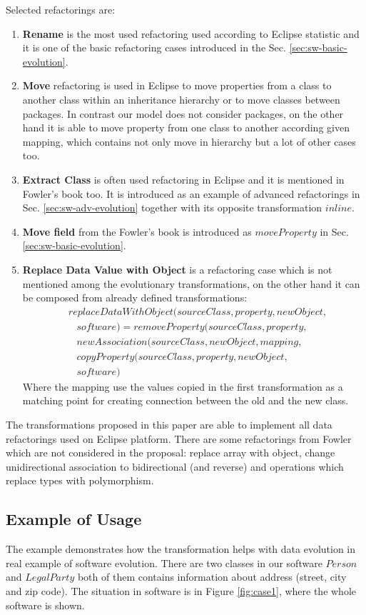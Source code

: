 \documentclass[11pt]{article}
\begin{document}
Selected refactorings are:
\begin{enumerate}
	\item \textbf{Rename} is the most used refactoring used according to Eclipse statistic and it is one of the basic refactoring cases introduced in the Sec. \ref{sec:sw-basic-evolution}.
	\item  \textbf{Move} refactoring is used in Eclipse to move properties from a class to another class within an inheritance hierarchy or to move classes between packages. In contrast our model does not consider packages, on the other hand it is able to move property from one class to another according given mapping, which contains not only move in hierarchy but a lot of other cases too.
	\item \textbf{Extract Class} is often used refactoring in Eclipse and it is mentioned in Fowler's book too. It is introduced as an example of advanced refactorings in Sec. \ref{sec:sw-adv-evolution} together with its opposite transformation $inline$.
	\item \textbf{Move field} from the Fowler's book is introduced as $moveProperty$ in Sec. \ref{sec:sw-basic-evolution}.
	\item \textbf{Replace Data Value with Object} is a refactoring case which is not mentioned among the evolutionary transformations, on the other hand it can be composed from already defined transformations:
	\begin{align*}
& replaceDataWithObject(sourceClass, property, newObject, \\
& \; \; \; software) = removeProperty(sourceClass, property, \\
& \; \; \; newAssociation(sourceClass, newObject,  mapping, \\
& \; \; \; copyProperty(sourceClass, property, newObject, \\ & \; \; \;  software)
	\end{align*}
Where the mapping use the values copied in the first transformation as a matching point for creating connection between the old and the new class.
\end{enumerate}
The transformations proposed in this paper are able to implement all data refactorings used on Eclipse platform. There are some refactorings from Fowler which are not considered in the proposal: replace array with object, change unidirectional association to bidirectional (and reverse) and operations which replace types with polymorphism.

\subsection{Example of Usage}
The example demonstrates how the transformation helps with data evolution in real example of software evolution. There are two classes in our software $Person$ and $LegalParty$ both of them contains information about address (street, city and zip code). The situation in software is in Figure \ref{fig:case1}, where the whole software is shown. 
\end{document}
